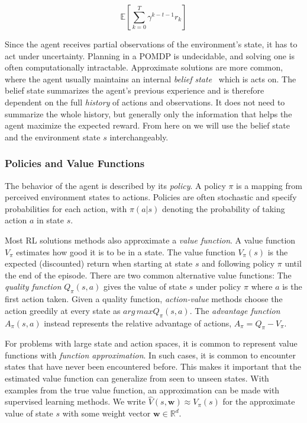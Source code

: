 \[ 
    \mathbb{E} \left[ \sum_{k=0}^T \gamma^{k-t-1} r_k \right]
\]

Since the agent receives partial observations of the environment's state, it has to act under uncertainty.
Planning in a POMDP is undecidable, and solving one is often computationally intractable.
Approximate solutions are more common, where the agent usually maintains an internal \textit{belief state}~\cite{kaelbling_pomdp_1998} which is acts on.
The belief state summarizes the agent's previous experience and is therefore dependent on the full \textit{history} of actions and observations.
It does not need to summarize the whole history, but generally only the information that helps the agent maximize the expected reward.
From here on we will use the belief state and the environment state \(s\) interchangeably. 

\subsubsection{Policies and Value Functions}
\label{sec:policy-value}

The behavior of the agent is described by its \textit{policy}.
A policy \(\pi\) is a mapping from perceived environment states to actions.
Policies are often stochastic and specify probabilities for each action, with \(\pi(a|s)\) denoting the probability of taking action \(a\) in state \(s\).~\cite{sutton_reinforcement_2018}

Most RL solutions methods also approximate a \textit{value function}.
A value function \(V_\pi\) estimates how good it is to be in a state.
The value function \(V_\pi(s)\) is the expected (discounted) return when starting at state \(s\) and following policy \(\pi\) until the end of the episode.
There are two common alternative value functions:
The \textit{quality function} \(Q_\pi(s,a)\) gives the value of state \(s\) under policy \(\pi\) where \(a\) is the first action taken.
Given a quality function, \textit{action-value} methods choose the action greedily at every state as \(arg\,max Q_\pi(s, a)\).
The \textit{advantage function} \(A_\pi(s, a)\) instead represents the relative advantage of actions, \(A_\pi = Q_\pi - V_\pi\).~\cite{sutton_reinforcement_2018}

For problems with large state and action spaces, it is common to represent value functions with \textit{function approximation}.
In such cases, it is common to encounter states that have never been encountered before.
This makes it important that the estimated value function can generalize from seen to unseen states.
With examples from the true value function, an approximation can be made with supervised learning methods.
We write \(\hat{V}(s,\mathbf{w}) \approx V_\pi(s)\) for the approximate value of state \(s\) with some weight vector \(\mathbf{w} \in \mathbb{R}^d\).~\cite{sutton_reinforcement_2018}

